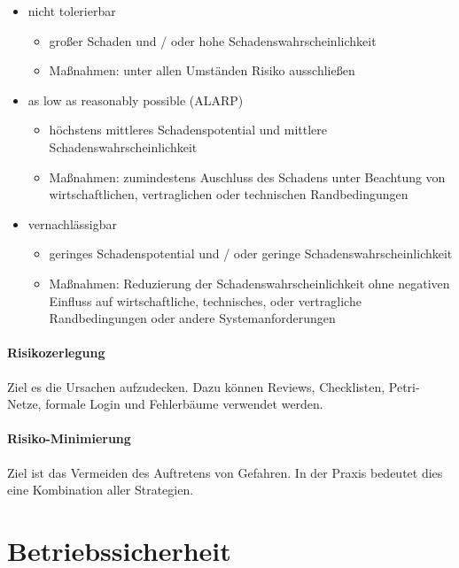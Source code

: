 \begin{itemize}
\item { nicht tolerierbar
\begin{itemize}
\item großer Schaden und / oder hohe Schadenswahrscheinlichkeit
\item Maßnahmen: unter allen Umständen Risiko ausschließen
\end{itemize}
 }
\item {as low as reasonably possible (ALARP)
\begin{itemize}
\item höchstens mittleres Schadenspotential und mittlere Schadenswahrscheinlichkeit
\item Maßnahmen: zumindestens Auschluss des Schadens unter Beachtung von wirtschaftlichen, vertraglichen oder technischen Randbedingungen
\end{itemize}
 }

\item { vernachlässigbar
\begin{itemize}
\item geringes Schadenspotential und / oder geringe Schadenswahrscheinlichkeit
\item Maßnahmen: Reduzierung der Schadenswahrscheinlichkeit ohne negativen Einfluss auf wirtschaftliche, technisches, oder vertragliche Randbedingungen oder andere Systemanforderungen
\end{itemize}
}

\end{itemize}


\paragraph{Risikozerlegung} Ziel es die Ursachen aufzudecken. Dazu können Reviews, Checklisten, Petri-Netze, formale Login und Fehlerbäume verwendet werden.


\paragraph{Risiko-Minimierung} Ziel ist das Vermeiden des Auftretens von Gefahren. In der Praxis bedeutet dies eine Kombination aller Strategien.

\section{Betriebssicherheit}

